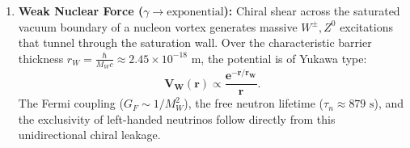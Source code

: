 \begin{enumerate}
    \item \textbf{Weak Nuclear Force ($\gamma \to \text{exponential}$):} Chiral shear across the saturated vacuum boundary of a nucleon vortex generates massive $W^\pm, Z^0$ excitations that tunnel through the saturation wall. Over the characteristic barrier thickness $r_W = \frac{\hbar}{M_W c} \approx 2.45 \times 10^{-18}\text{ m}$, the potential is of Yukawa type:
          \begin{equation}
              \mathbf{V_W(r) \propto \frac{e^{-r/r_W}}{r}}.
          \end{equation}
          The Fermi coupling ($G_F \sim 1/M_W^2$), the free neutron lifetime ($\tau_n \approx 879\text{ s}$), and the exclusivity of left-handed neutrinos follow directly from this unidirectional chiral leakage.
\end{enumerate}

\begin{table}[h!]
    \centering
    \small
    \caption{Geometric synthesis of the four fundamental interactions under the Master Vacuum Inflow Formula.}
    \label{tab:dort_kuvvet_sentez_main}
\end{table}

